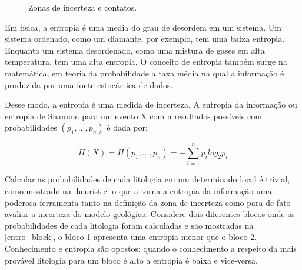 \begin{figure}[H] 
	\caption{Zonas de incerteza e contatos.} \label{zonas}
	\centering
	\qquad
\end{figure}

Em física, a entropia é uma media do grau de desordem em um sistema. Um sistema ordenado, como um diamante, por exemplo, tem uma baixa entropia. Enquanto um sistema desordenado, como uma mistura de gases em alta temperatura, tem uma alta entropia. O conceito de entropia também surge na matemática, em teoria da probabilidade a taxa média na qual a informação é produzida por uma fonte estocástica de dados.

Desse modo, a entropia é uma medida de incerteza. A entropia da informação ou entropia de Shannon \cite{shannon1948mathematical} para um evento X com n resultados possíveis com probabilidades $(p_1, ..., p_n)$ é dada por:

\begin{equation}
    H(X)=H(p_1, ..., p_n)=-\sum^n_{i=1}p_ilog_{2}p_i
\end{equation}

Calcular as probabilidades de cada litologia em um determinado local é trivial, como mostrado na \autoref{heuristic} o que a torna a entropia da informação uma poderosa ferramenta tanto na definição da zona de incerteza como para de fato avaliar a incerteza do modelo geológico. Considere dois diferentes blocos onde as probabilidades de cada litologia foram calculadas e são mostradas na \autoref{entro_block}, o bloco 1 apresenta uma entropia menor que o bloco 2. Conhecimento e entropia são opostos: quando o conhecimento a respeito da mais provável litologia para um bloco é alto a entropia é baixa e vice-versa. 

